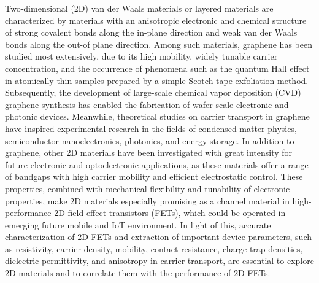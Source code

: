 \documentclass[12pt,a4paper]{report}
\begin{document}
Two-dimensional (2D) van der Waals materials or layered materials are characterized by materials with an anisotropic electronic and chemical structure of strong covalent bonds along the in-plane direction and weak van der Waals bonds along the out-of plane direction. Among such materials, graphene has been studied most extensively, due to its high mobility, widely tunable carrier concentration, and the occurrence of phenomena such as the quantum Hall effect in atomically thin samples prepared by a simple Scotch tape exfoliation method. Subsequently, the development of large-scale chemical vapor deposition (CVD) graphene synthesis has enabled the fabrication of wafer-scale electronic and photonic devices.  Meanwhile, theoretical studies on carrier transport in graphene have inspired experimental research in the fields of condensed matter physics, semiconductor nanoelectronics, photonics, and energy storage. In addition to graphene, other 2D materials have been investigated with great intensity for future electronic and optoelectronic applications, as these materials offer a range of bandgaps with high carrier mobility and efficient electrostatic control. These properties, combined with mechanical flexibility and tunability of electronic properties, make 2D materials especially promising as a channel material in high-performance 2D field effect transistors (FETs), which could be operated in emerging future mobile and IoT environment. In light of this, accurate characterization of 2D FETs and extraction of important device parameters, such as resistivity, carrier density, mobility, contact resistance, charge trap densities, dielectric permittivity, and anisotropy in carrier transport, are essential to explore 2D materials and to correlate them with the performance of 2D FETs. 
\end{document}
